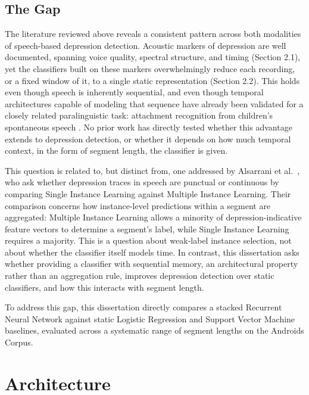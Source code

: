 \documentclass{mproj}
\begin{document}
\section{The Gap}\label{sec:gap}

The literature reviewed above reveals a consistent pattern across both modalities of speech-based depression detection. Acoustic markers of depression are well documented, spanning voice quality, spectral structure, and timing (Section 2.1), yet the classifiers built on these markers overwhelmingly reduce each recording, or a fixed window of it, to a single static representation (Section 2.2). This holds even though speech is inherently sequential, and even though temporal architectures capable of modeling that sequence have already been validated for a closely related paralinguistic task: attachment recognition from children's spontaneous speech \cite{alsofyani2021}. No prior work has directly tested whether this advantage extends to depression detection, or whether it depends on how much temporal context, in the form of segment length, the classifier is given.

This question is related to, but distinct from, one addressed by Alsarrani et al.\ \cite{alsarrani2025}, who ask whether depression traces in speech are punctual or continuous by comparing Single Instance Learning against Multiple Instance Learning. Their comparison concerns how instance-level predictions within a segment are aggregated: Multiple Instance Learning allows a minority of depression-indicative feature vectors to determine a segment's label, while Single Instance Learning requires a majority. This is a question about weak-label instance selection, not about whether the classifier itself models time. In contrast, this dissertation asks whether providing a classifier with sequential memory, an architectural property rather than an aggregation rule, improves depression detection over static classifiers, and how this interacts with segment length.

To address this gap, this dissertation directly compares a stacked Recurrent Neural Network against static Logistic Regression and Support Vector Machine baselines, evaluated across a systematic range of segment lengths on the Androids Corpus.

\chapter{Architecture}\label{architecture}
\end{document}
